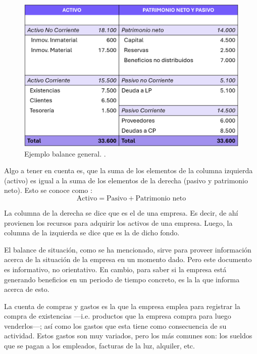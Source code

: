 \begin{figure}[H]
    \centering
    \includegraphics[scale = 0.5]{imgs/balance.png}
    \caption{Ejemplo balance general. .}
    \label{balance}
\end{figure}


Algo a tener en cuenta es, que la suma de los elementos de la columna izquierda (activo) es igual a la suma de los elementos de la derecha (pasivo y patrimonio neto). Esto se conoce como :
\begin{equation*}
    \text{Activo} = \text{Pasivo} + \text{Patrimonio neto}
\end{equation*}

La columna de la derecha se dice que es el  de una empresa. Es decir, de ahí provienen los recursos para adquirir los activos de una empresa. Luego, la columna de la izquierda se dice que es la  de dicho fondo. 

El balance de situación, como se ha mencionado, sirve para proveer información acerca de la situación de la empresa en un momento dado. Pero este documento es informativo, no orientativo. En cambio, para saber si la empresa está generando  beneficios en un periodo de tiempo concreto, es la  la que informa acerca de esto. 

\bigskip


La cuenta de compras y gastos es la que la empresa emplea para registrar la compra de existencias ---i.e. productos que la empresa compra para luego  venderlos\fnm---; así como los gastos que esta tiene como consecuencia de su actividad. Estos gastos son muy variados, pero los más comunes son: los sueldos que se pagan a los empleados, facturas de la luz, alquiler, etc.

